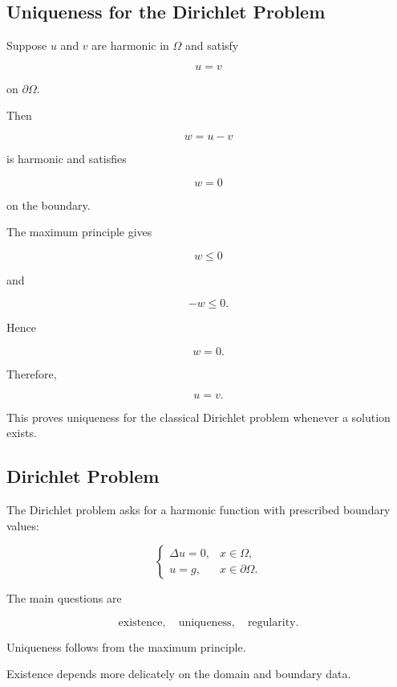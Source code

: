 \subsection{Uniqueness for the Dirichlet Problem}
\label{subsec:dirichlet-uniqueness}

Suppose \(u\) and \(v\) are harmonic in \(\Omega\) and satisfy

\[
u=v
\]

on \(\partial\Omega\).

Then

\[
w=u-v
\]

is harmonic and satisfies

\[
w=0
\]

on the boundary.

The maximum principle gives

\[
w\leq0
\]

and

\[
-w\leq0.
\]

Hence

\[
w=0.
\]

Therefore,

\[
\boxed{
u=v.
}
\]

This proves uniqueness for the classical Dirichlet problem whenever a
solution exists.

\subsection{Dirichlet Problem}
\label{subsec:dirichlet-problem}

The Dirichlet problem asks for a harmonic function with prescribed
boundary values:

\[
\boxed{
\begin{cases}
\Delta u=0,
& x\in\Omega,\\
u=g,
& x\in\partial\Omega.
\end{cases}
}
\]

The main questions are

\[
\boxed{
\text{existence},
\quad
\text{uniqueness},
\quad
\text{regularity}.
}
\]

Uniqueness follows from the maximum principle.

Existence depends more delicately on the domain and boundary data.

